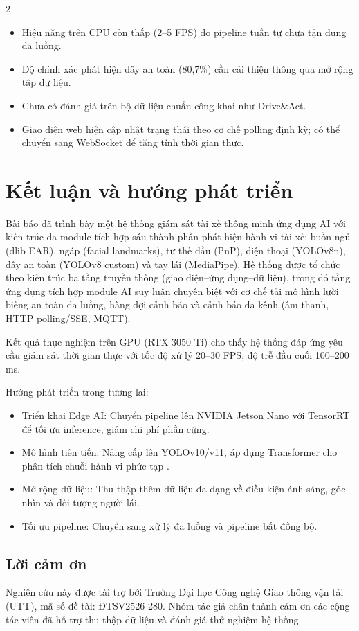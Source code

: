 \documentclass[10pt]{article}
\begin{document}
\begin{multicols}{2}
\begin{itemize}[leftmargin=*,nosep]
  \item Hiệu năng trên CPU còn thấp (2--5 FPS) do pipeline tuần tự chưa tận dụng đa luồng.
  \item Độ chính xác phát hiện dây an toàn (80,7\%) cần cải thiện thông qua mở rộng tập dữ liệu.
  \item Chưa có đánh giá trên bộ dữ liệu chuẩn công khai như Drive\&Act.
  \item Giao diện web hiện cập nhật trạng thái theo cơ chế polling định kỳ; có thể chuyển sang WebSocket để tăng tính thời gian thực.
\end{itemize}

\section{Kết luận và hướng phát triển}

Bài báo đã trình bày một hệ thống giám sát tài xế thông minh ứng dụng AI với kiến trúc đa module tích hợp sáu thành phần phát hiện hành vi tài xế: buồn ngủ (dlib EAR), ngáp (facial landmarks), tư thế đầu (PnP), điện thoại (YOLOv8n), dây an toàn (YOLOv8 custom) và tay lái (MediaPipe). Hệ thống được tổ chức theo kiến trúc ba tầng truyền thống (giao diện--ứng dụng--dữ liệu), trong đó tầng ứng dụng tích hợp module AI suy luận chuyên biệt với cơ chế tải mô hình lười biếng an toàn đa luồng, hàng đợi cảnh báo và cảnh báo đa kênh (âm thanh, HTTP polling/SSE, MQTT).

Kết quả thực nghiệm trên GPU (RTX 3050 Ti) cho thấy hệ thống đáp ứng yêu cầu giám sát thời gian thực với tốc độ xử lý 20--30 FPS, độ trễ đầu cuối 100--200 ms.

Hướng phát triển trong tương lai:
\begin{itemize}[leftmargin=*,nosep]
  \item Triển khai Edge AI: Chuyển pipeline lên NVIDIA Jetson Nano với TensorRT để tối ưu inference, giảm chi phí phần cứng.
  \item Mô hình tiên tiến: Nâng cấp lên YOLOv10/v11, áp dụng Transformer cho phân tích chuỗi hành vi phức tạp \cite{nimma2025}.
  \item Mở rộng dữ liệu: Thu thập thêm dữ liệu đa dạng về điều kiện ánh sáng, góc nhìn và đối tượng người lái.
  \item Tối ưu pipeline: Chuyển sang xử lý đa luồng và pipeline bất đồng bộ.
\end{itemize}

\subsection*{Lời cảm ơn}
Nghiên cứu này được tài trợ bởi Trường Đại học Công nghệ Giao thông vận tải (UTT), mã số đề tài: ĐTSV2526-280. Nhóm tác giả chân thành cảm ơn các cộng tác viên đã hỗ trợ thu thập dữ liệu và đánh giá thử nghiệm hệ thống.


\end{multicols}
\end{document}
